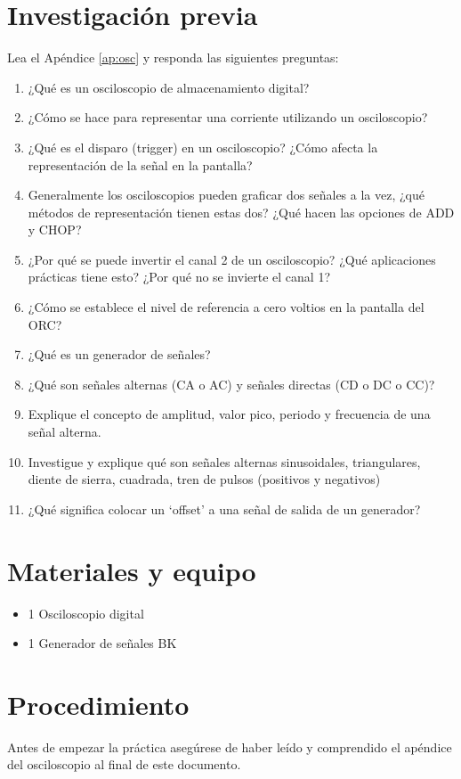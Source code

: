 \documentclass[12pt,letterpaper]{report}
\newcommand{\inv}{Investigación previa}
\newcommand{\mat}{Materiales y equipo}
\newcommand{\pro}{Procedimiento}
\begin{document}
\section{\inv}
Lea el Apéndice \ref{ap:osc} y responda las siguientes preguntas:
\begin{enumerate}
\item ¿Qué es un osciloscopio de almacenamiento digital?
\item ¿Cómo se hace para representar una corriente utilizando un osciloscopio?
\item ¿Qué es el disparo (trigger) en un osciloscopio? ¿Cómo afecta la
representación de la señal en la pantalla?
\item Generalmente los osciloscopios pueden graficar dos señales a la vez, ¿qué
métodos de representación tienen estas dos? ¿Qué hacen las opciones de
ADD y CHOP?
\item ¿Por qué se puede invertir el canal 2 de un osciloscopio? ¿Qué aplicaciones
prácticas tiene esto? ¿Por qué no se invierte el canal 1?
\item ¿Cómo se establece el nivel de referencia a cero voltios en la pantalla del
ORC?
\item ¿Qué es un generador de señales?
\item ¿Qué son señales alternas (CA o AC) y señales directas (CD o DC o CC)?
\item Explique el concepto de amplitud, valor pico, periodo y frecuencia de una
señal alterna.
\item Investigue y explique qué son señales alternas sinusoidales, triangulares,
diente de sierra, cuadrada, tren de pulsos (positivos y negativos)
\item ¿Qué significa colocar un ‘offset’ a una señal de salida de un generador?
\end{enumerate}

\section{\mat}
\begin{itemize}
\item 1 Osciloscopio digital
\item 1 Generador de señales BK
\end{itemize}

\section{\pro}
Antes de empezar la práctica asegúrese de haber leído y comprendido el apéndice
del osciloscopio al final de este documento.
\end{document}
